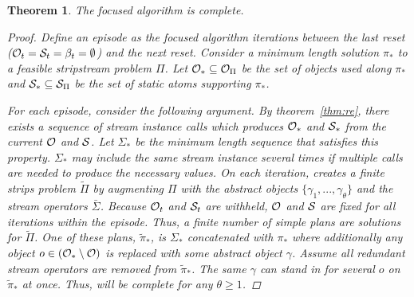 \documentclass[letterpaper]{article} %
\theoremstyle{plain}\newtheorem{thm}{Theorem}
\theoremstyle{definition}\newtheorem{defn}{Definition}
\theoremstyle{plain}\newtheorem{lem}{Lemma}
\theoremstyle{plain}\newtheorem{cor}{Corollary}
\newcommand{\algname}{{\sc strips}tream}
\newcommand{\strips}{{\sc strips}}
\newcommand{\focused}{focused}
\begin{document}
\begin{thm}
The \focused{} algorithm is complete.
\begin{proof}

Define an episode as the \focused{} algorithm iterations between the last reset (${\cal O}_t = {\cal S}_t = \beta_t = \emptyset$) and the next reset. %
Consider a minimum length solution $\pi_*$ to a feasible \algname{} problem $\Pi$. Let ${\cal O}_* \subseteq {\cal O}_\Pi$ be the set of objects used along $\pi_*$ and ${\cal S}_* \subseteq {\cal S}_\Pi$ be the set of static atoms supporting $\pi_*$.

For each episode, consider the following argument.
By theorem~\ref{thm:re}, there exists a sequence of stream instance calls which produces ${\cal O}_*$ and ${\cal S}_*$ from the current ${\cal O}$ and ${\cal S}$. Let $\Sigma_*$ be the minimum length sequence that satisfies this property.
$\Sigma_*$ may include the same stream instance several times if multiple calls are needed to produce the necessary values.
On each iteration, \proc{\focused{}} creates a finite \strips{} problem $\tilde{\Pi}$ by augmenting $\Pi$ with the abstract objects $\{\gamma_1, ..., \gamma_\theta\}$ and the stream operators $\bar{\Sigma}$. 
Because ${\cal O}_t$ and ${\cal S}_t$ are withheld, ${\cal O}$ and ${\cal S}$ are fixed for all iterations within the episode. 
Thus, a finite number of simple plans are solutions for $\tilde{\Pi}$.
One of these plans, $\tilde{\pi}_*$, is $\Sigma_*$ concatenated with $\pi_*$ where additionally any object $o \in ({\cal O}_* \setminus {\cal O})$ is replaced with some abstract object $\gamma$. Assume all redundant stream operators are removed from $\tilde{\pi}_*$.
The same $\gamma$ can stand in for several $o$ on $\tilde{\pi}_*$ at once.
Thus, \proc{\focused{}} will be complete for any $\theta \geq 1$.


\end{proof}
\end{thm}
\end{document}
